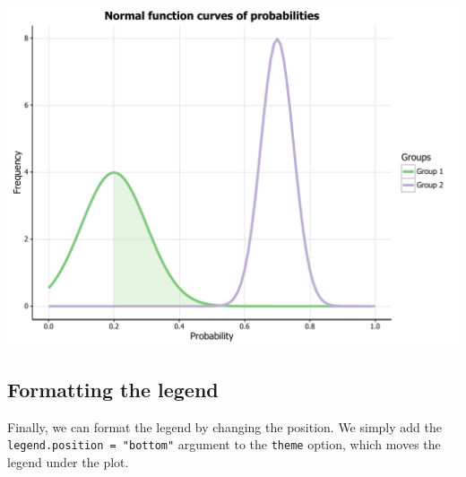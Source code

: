 \documentclass[]{article}
\newenvironment{Shaded}{\begin{snugshade}}{\end{snugshade}}
\newcommand{\KeywordTok}[1]{\textcolor[rgb]{0.13,0.29,0.53}{\textbf{{#1}}}}
\newcommand{\DataTypeTok}[1]{\textcolor[rgb]{0.13,0.29,0.53}{{#1}}}
\newcommand{\DecValTok}[1]{\textcolor[rgb]{0.00,0.00,0.81}{{#1}}}
\newcommand{\FloatTok}[1]{\textcolor[rgb]{0.00,0.00,0.81}{{#1}}}
\newcommand{\StringTok}[1]{\textcolor[rgb]{0.31,0.60,0.02}{{#1}}}
\newcommand{\OtherTok}[1]{\textcolor[rgb]{0.56,0.35,0.01}{{#1}}}
\newcommand{\NormalTok}[1]{{#1}}
\begin{document}
\begin{Shaded}
\end{Shaded}

\begin{center}\includegraphics{0_all_posts_pdf/function_17-1} \end{center}

\subsection{Formatting the legend}\label{formatting-the-legend-2}

Finally, we can format the legend by changing the position. We simply
add the \texttt{legend.position\ =\ "bottom"} argument to the
\texttt{theme} option, which moves the legend under the plot.
\end{document}
